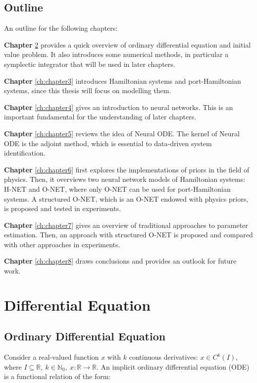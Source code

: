 \documentclass[
	parskip, 			   %
	twoside, 			   %
	DIV=14, 			   %
	BCOR=15.0mm, 		   %
	headsepline, 		   %
	open=right, 		   %
	captions=tableheading, %
	bibliography=totoc,    %
	numbers=noenddot       %
]{scrreprt}
\begin{document}
\section{Outline}
An outline for the following chapters:

\textbf{Chapter} \ref{ch:chapter2} provides a quick overview of ordinary differential equation and initial value problem. It also introduces some numerical methods, in particular a symplectic integrator that will be used in later chapters.

\textbf{Chapter} \ref{ch:chapter3} introduces Hamiltonian systems and port-Hamiltonian systems, since this thesis will focus on modelling them.

\textbf{Chapter} \ref{ch:chapter4} gives an introduction to neural networks. This is an important fundamental for the understanding of later chapters.

\textbf{Chapter} \ref{ch:chapter5} reviews the idea of Neural ODE. The kernel of Neural ODE is the adjoint method, which is essential to data-driven system identification.

\textbf{Chapter} \ref{ch:chapter6} first explores the implementations of priors in the field of physics. Then, it overviews two neural network models of Hamiltonian systems: H-NET and O-NET, where only O-NET can be used for port-Hamiltonian systems. A structured O-NET, which is an O-NET endowed with physics priors, is proposed and tested in experiments.

\textbf{Chapter} \ref{ch:chapter7} gives an overview of traditional approaches to parameter estimation. Then, an approach with structured O-NET is proposed and compared with other approaches in experiments.

\textbf{Chapter} \ref{ch:chapter8} draws conclusions and provides an outlook for future work.


\clearpage
\chapter{Differential Equation}
\label{ch:chapter2}

\section{Ordinary Differential Equation}
Consider a real-valued function $x$ with $k$ continuous derivatives: $x \in C^{k}(I)$, where $ I \subseteq \mathbb{R}, \: k \in \mathbb{N}_{0}, \: x: \mathbb{R} \rightarrow \mathbb{R}$. An implicit ordinary differential equation (ODE) is a functional relation of the form:
\end{document}
